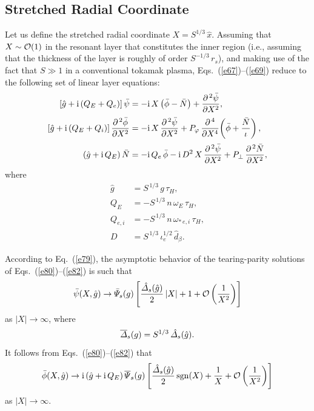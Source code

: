 \documentclass[12pt,prb,aps]{revtex4-1}
\begin{document}
\subsection{Stretched Radial Coordinate}
Let us define the stretched radial coordinate $X = S^{1/3}\,\hat{x}$.
Assuming that $X\sim{\cal O}(1)$ in the resonant layer that constitutes the inner region (i.e., assuming that the thickness of the layer is roughly of order $S^{-1/3}\,r_s$),
and making use of the fact that $S\gg 1$ in a conventional tokamak plasma,  Eqs.~(\ref{e67})--(\ref{e69}) reduce to the following
set of linear layer equations:
\begin{align}\label{e80}
\left[\hat{g}+{\rm i}\,(Q_E+Q_{e})\right]\bar{\psi}&= - {\rm i}\,X\left(\bar{\phi}-\bar{N}\right) + \frac{\partial^{\,2}\bar{\psi}}{\partial X^2},\\[0.5ex]
\left[\hat{g}+{\rm i}\,(Q_E +Q_{i})\right]\frac{\partial^{\,2}\bar{\phi}}{\partial X^2}&= - {\rm i}\,X\,\frac{\partial^{\,2}\bar{\psi}}{\partial X^2}+ P_\varphi\,\frac{\partial^{\,4}}{\partial X^4}\!\left(\bar{\phi} + \frac{\bar{N}}{\iota}\right),\\[0.5ex]
\left(\hat{g}+{\rm i}\,Q_E\right)\bar{N} &= - {\rm i}\,Q_{e}\,\bar{\phi}  - {\rm i} \,D^{2}\,X\,\frac{\partial^{\,2}\bar{\psi}}{\partial X^{2}}
+ P_\perp\,\frac{\partial^{\,2} \bar{N}}{\partial X^{2}},\label{e82}
\end{align}
where 
\begin{align}
\hat{g}&=S^{\,1/3}\,g\,\tau_H, \\[0.5ex]
Q_E& = -S^{\,1/3}\,n\,\omega_E\,\tau_H, \\[0.5ex]
Q_{e,i} &= -S^{\,1/3}\,n\,\omega_{\ast\,e,i}\,\tau_H,\\[0.5ex]
D &= S^{\,1/3}\,\iota_e^{1/2}\,\hat{d}_\beta.
\end{align} 

According to Eq.~(\ref{e79}), the asymptotic behavior of the tearing-parity solutions of Eqs.~(\ref{e80})--(\ref{e82}) is
such that
\begin{equation}\label{e47}
\bar{\psi}(X,\hat{g})\rightarrow  \bar{\mit\Psi}_s(g)\left[\frac{\hat{\mit\Delta}_s(\hat{g})}{2}\,|X| +1 + {\cal O}\left(\frac{1}{X^2}\right)\right]
\end{equation}
as $|X|\rightarrow\infty$, where
\begin{equation}\label{e84}
\overline{\mit\Delta}_s(g) = S^{1/3}\,\hat{\mit\Delta}_s(\hat{g}).
\end{equation}
It follows from Eqs.~(\ref{e80})--(\ref{e82}) that
\begin{equation}\label{e85}
\bar{\phi}(X,\hat{g})\rightarrow {\rm i}\,(\hat{g}+{\rm i}\,Q_E)\,\overline{\mit\Psi}_s(g)\left[ \frac{\hat{\mit\Delta}_s(\hat{g})}{2}\,{\rm sgn}(X)+ \frac{1}{X}+ {\cal O}\left(\frac{1}{X^2}\right)\right]
\end{equation}
as $|X|\rightarrow\infty$. 
\end{document}
